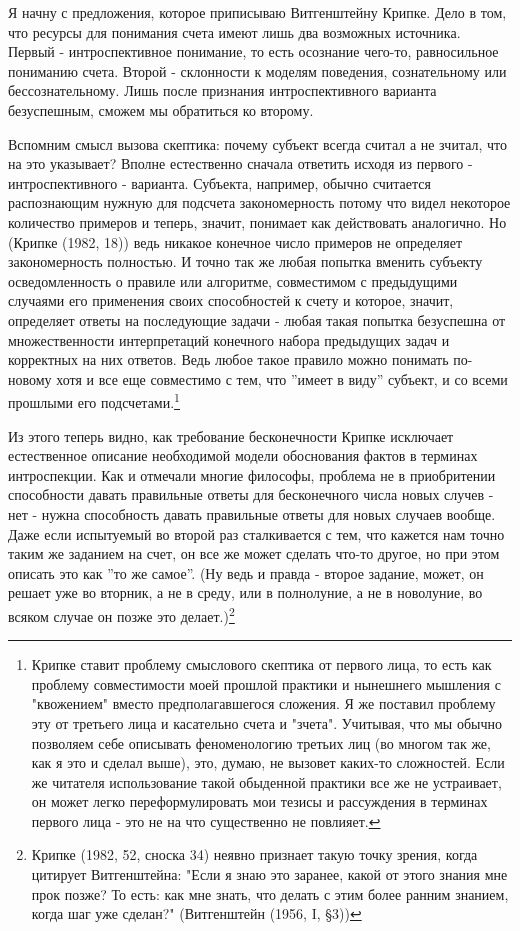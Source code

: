 \documentclass{book}
\begin{document}
Я начну с предложения, которое приписываю Витгенштейну Крипке. Дело в том, что ресурсы для понимания счета имеют лишь два возможных источника. Первый - интроспективное понимание, то есть осознание чего-то, равносильное пониманию счета. Второй - склонности к моделям поведения, сознательному или бессознательному. Лишь после признания интроспективного варианта безуспешным, сможем мы обратиться ко второму.

Вспомним смысл вызова скептика: почему субъект всегда считал а не зчитал, что на это указывает? Вполне естественно сначала ответить исходя из первого - интроспективного - варианта. Субъекта, например, обычно считается распознающим нужную для подсчета закономерность потому что видел некоторое количество примеров и теперь, значит, понимает как действовать аналогично. Но (Крипке (1982, 18)) ведь никакое конечное число примеров не определяет закономерность полностью. И точно так же любая попытка вменить субъекту осведомленность о правиле или алгоритме, совместимом с предыдущими случаями его применения своих способностей к счету и которое, значит, определяет ответы на последующие задачи - любая такая попытка безуспешна от множественности интерпретаций конечного набора предыдущих задач и корректных на них ответов. Ведь любое такое правило можно понимать по-новому хотя и все еще совместимо с тем, что ''имеет в виду'' субъект, и со всеми прошлыми его подсчетами.\footnote{Крипке ставит проблему смыслового скептика от первого лица, то есть как проблему совместимости моей прошлой практики и нынешнего мышления с "квожением" вместо предполагавшегося сложения. Я же поставил проблему эту от третьего лица и касательно счета и "зчета". Учитывая, что мы обычно позволяем себе описывать феноменологию третьих лиц (во многом так же, как я это и сделал выше), это, думаю, не вызовет каких-то сложностей. Если же читателя использование такой обыденной практики все же не устраивает, он может легко переформулировать мои тезисы и рассуждения в терминах первого лица - это не на что существенно не повлияет.}

Из этого теперь видно, как требование бесконечности Крипке исключает естественное описание необходимой модели обоснования фактов в терминах интроспекции. Как и отмечали многие философы, проблема не в приобритении способности давать правильные ответы для бесконечного числа новых случев - нет - нужна способность давать правильные ответы для новых случаев вообще. Даже если испытуемый во второй раз сталкивается с тем, что кажется нам точно таким же заданием на счет, он все же может сделать что-то другое, но при этом описать это как ''то же самое''. (Ну ведь и правда - второе задание, может, он решает уже во вторник, а не в среду, или в полнолуние, а не в новолуние, во всяком случае он позже это делает.)\footnote{Крипке (1982, 52, сноска 34) неявно признает такую точку зрения, когда цитирует Витгенштейна: "Если я знаю это заранее, какой от этого знания мне прок позже? То есть: как мне знать, что делать с этим более ранним знанием, когда шаг уже сделан?" (Витгенштейн (1956, I, §3))}
\end{document}
